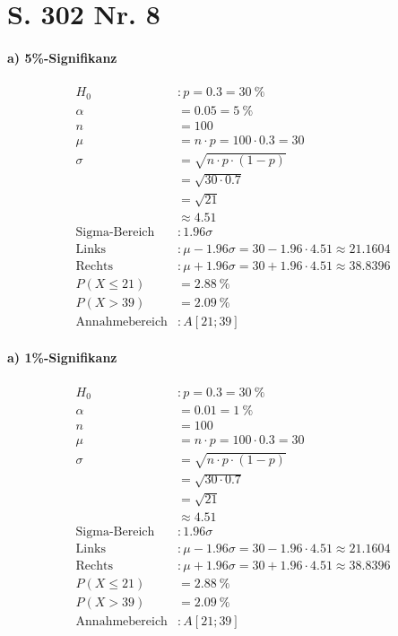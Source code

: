 \documentclass[12pt,a4paper]{report}
\begin{document}
	\section{S. 302 Nr. 8}
	\paragraph{a) 5\%-Signifikanz}
	\begin{align*}
		H_0 &: p=0.3 = 30\ \% \\
		\alpha &= 0.05 = 5\ \% \\
		n &= 100 \\
		\mu &= n \cdot p = 100 \cdot 0.3 = 30 \\
		\sigma &= \sqrt{n\cdot p\cdot (1-p)} \\
		&= \sqrt{30 \cdot 0.7} \\
		&= \sqrt{21} \\
		&\approx 4.51 \\
		\text{Sigma-Bereich}&: 1.96\sigma \\
		\text{Links}&: \mu - 1.96\sigma = 30 - 1.96\cdot 4.51 \approx 21.1604 \\
		\text{Rechts}&: \mu + 1.96\sigma = 30 + 1.96\cdot 4.51 \approx 38.8396 \\
		P(X \leq 21)&= 2.88\ \% \\
		P(X > 39) &= 2.09\ \% \\
		\text{Annahmebereich}&: A[21;39]
	\end{align*}
	\paragraph{a) 1\%-Signifikanz}
	\begin{align*}
		H_0 &: p=0.3 = 30\ \% \\
		\alpha &= 0.01 = 1\ \% \\
		n &= 100 \\
		\mu &= n \cdot p = 100 \cdot 0.3 = 30 \\
		\sigma &= \sqrt{n\cdot p\cdot (1-p)} \\
		&= \sqrt{30 \cdot 0.7} \\
		&= \sqrt{21} \\
		&\approx 4.51 \\
		\text{Sigma-Bereich}&: 1.96\sigma \\
		\text{Links}&: \mu - 1.96\sigma = 30 - 1.96\cdot 4.51 \approx 21.1604 \\
		\text{Rechts}&: \mu + 1.96\sigma = 30 + 1.96\cdot 4.51 \approx 38.8396 \\
		P(X \leq 21)&= 2.88\ \% \\
		P(X > 39) &= 2.09\ \% \\
		\text{Annahmebereich}&: A[21;39]
	\end{align*}
\end{document}
